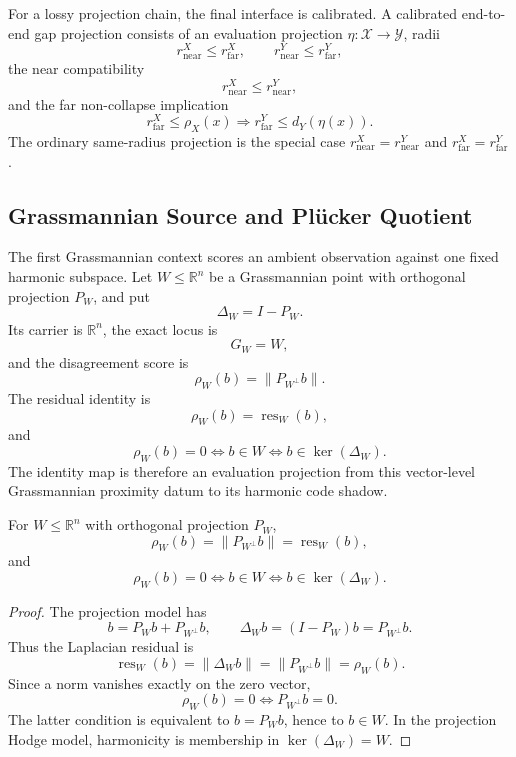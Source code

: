 For a lossy projection chain, the final interface is calibrated. A calibrated
end-to-end gap projection consists of an evaluation projection
\(\eta:\mathcal X\to\mathcal Y\), radii
\[
  r^X_{\mathrm{near}}\le r^X_{\mathrm{far}},
  \qquad
  r^Y_{\mathrm{near}}\le r^Y_{\mathrm{far}},
\]
the near compatibility
\[
  r^X_{\mathrm{near}}\le r^Y_{\mathrm{near}},
\]
and the far non-collapse implication
\[
  r^X_{\mathrm{far}}\le \rho_X(x)
  \Longrightarrow
  r^Y_{\mathrm{far}}\le d_Y(\eta(x)).
\]
The ordinary same-radius projection is the special case
\(r^X_{\mathrm{near}}=r^Y_{\mathrm{near}}\) and
\(r^X_{\mathrm{far}}=r^Y_{\mathrm{far}}\).

\subsection{Grassmannian Source and Pl\"ucker Quotient}

The first Grassmannian context scores an ambient observation against one fixed
harmonic subspace. Let \(W\le \mathbb R^n\) be a Grassmannian point with
orthogonal projection \(P_W\), and put
\[
  \Delta_W=I-P_W.
\]
Its carrier is \(\mathbb R^n\), the exact locus is
\[
  G_W=W,
\]
and the disagreement score is
\[
  \rho_W(b)=\|P_{W^\perp}b\|.
\]
The residual identity is
\[
  \rho_W(b)=\operatorname{res}_W(b),
\]
and
\[
  \rho_W(b)=0
  \Longleftrightarrow
  b\in W
  \Longleftrightarrow
  b\in\ker(\Delta_W).
\]
The identity map is therefore an evaluation projection from this vector-level
Grassmannian proximity datum to its harmonic code shadow.

\begin{proposition}\label{prop:grassmannian-residual}
For \(W\le\mathbb R^n\) with orthogonal projection \(P_W\),
\[
  \rho_W(b)=\|P_{W^\perp}b\|
  =
  \operatorname{res}_W(b),
\]
and
\[
  \rho_W(b)=0
  \Longleftrightarrow b\in W
  \Longleftrightarrow b\in\ker(\Delta_W).
\]
\end{proposition}

\begin{proof}
The projection model has
\[
  b=P_Wb+P_{W^\perp}b,\qquad
  \Delta_W b=(I-P_W)b=P_{W^\perp}b.
\]
Thus the Laplacian residual is
\[
  \operatorname{res}_W(b)=\|\Delta_W b\|=\|P_{W^\perp}b\|=\rho_W(b).
\]
Since a norm vanishes exactly on the zero vector,
\[
  \rho_W(b)=0
  \Longleftrightarrow P_{W^\perp}b=0.
\]
The latter condition is equivalent to \(b=P_Wb\), hence to \(b\in W\). In the
projection Hodge model, harmonicity is membership in \(\ker(\Delta_W)=W\).
\end{proof}

